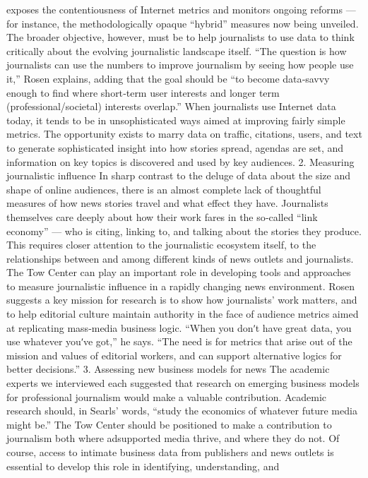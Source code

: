 exposes the contentiousness of Internet metrics and monitors ongoing
reforms — for instance, the methodologically opaque ``hybrid'' measures
now being unveiled. The broader objective, however, must be to help
journalists to use data to think critically about the evolving journalistic
landscape itself.
``The question is how journalists can use the numbers to improve
journalism by seeing how people use it,'' Rosen explains, adding that the
goal should be ``to become data‐savvy enough to find where short‐term
user interests and longer term (professional/societal) interests overlap.''
When journalists use Internet data today, it tends to be in unsophisticated
ways aimed at improving fairly simple metrics. The opportunity exists to
marry data on traffic, citations, users, and text to generate sophisticated
insight into how stories spread, agendas are set, and information on key
topics is discovered and used by key audiences.
2. Measuring journalistic influence
In sharp contrast to the deluge of data about the size and shape of online
audiences, there is an almost complete lack of thoughtful measures of how
news stories travel and what effect they have. Journalists themselves care
deeply about how their work fares in the so‐called ``link economy'' — who
is citing, linking to, and talking about the stories they produce. This
requires closer attention to the journalistic ecosystem itself, to the
relationships between and among different kinds of news outlets and
journalists.
The Tow Center can play an important role in developing tools and
approaches to measure journalistic influence in a rapidly changing news
environment. Rosen suggests a key mission for research is to show how
journalists’ work matters, and to help editorial culture maintain authority
in the face of audience metrics aimed at replicating mass‐media business
logic. ``When you donʹt have great data, you use whatever youʹve got,'' he
says. ``The need is for metrics that arise out of the mission and values of
editorial workers, and can support alternative logics for better decisions.''
3. Assessing new business models for news
The academic experts we interviewed each suggested that research on
emerging business models for professional journalism would make a
valuable contribution. Academic research should, in Searls’ words, ``study
the economics of whatever future media might be.'' The Tow Center
should be positioned to make a contribution to journalism both where adsupported
media thrive, and where they do not.
Of course, access to intimate business data from publishers and news
outlets is essential to develop this role in identifying, understanding, and
